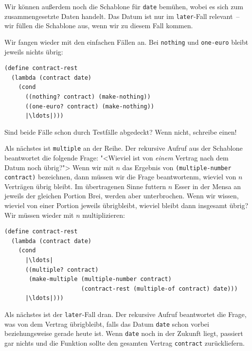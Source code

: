 %
Wir können außerdem noch die Schablone für \lstinline{date} bemühen,
wobei es sich zum zusammengesetzte Daten handelt.  Das Datum ist nur
im \lstinline{later}-Fall relevant~-- wir füllen die Schablone aus,
wenn wir zu diesem Fall kommen.

Wir fangen wieder mit den einfachen Fällen an.  Bei
\lstinline{nothing} und \lstinline{one-euro} bleibt jeweils nichts
übrig:
%
\begin{lstlisting}
(define contract-rest
  (lambda (contract date)
    (cond
      ((nothing? contract) (make-nothing))
      ((one-euro? contract) (make-nothing))
      |\ldots|)))
\end{lstlisting}
%
\begin{aufgabeinline}
  Sind beide Fälle schon durch Testfälle abgedeckt?  Wenn nicht,
  schreibe einen!
\end{aufgabeinline}
%
Als nächstes ist \lstinline{multiple} an der Reihe.  Der rekursive
Aufruf aus der Schablone beantwortet die folgende Frage: "<Wieviel ist
von \emph{einem} Vertrag nach dem Datum noch übrig?"> Wenn wir mit $n$
das Ergebnis von \lstinline{(multiple-number contract)} bezeichnen,
dann müssen wir die Frage beantwortenm, wieviel von $n$
Verträgen übrig bleibt.  Im übertragenen Sinne futtern $n$ Esser in
der Mensa an jeweils der gleichen Portion Brei, werden aber
unterbrochen. Wenn wir wissen, wieviel von einer Portion jeweils übrigbleibt,
wieviel bleibt dann insgesamt übrig?  Wir müssen wieder mit $n$
multiplizieren:
%
\begin{lstlisting}
(define contract-rest
  (lambda (contract date)
    (cond
      |\ldots|
      ((multiple? contract)
       (make-multiple (multiple-number contract)
                      (contract-rest (multiple-of contract) date)))
      |\ldots|)))
\end{lstlisting}
%
Als nächstes ist der \lstinline{later}-Fall dran.  Der rekursive
Aufruf beantwortet die Frage, was von dem Vertrag übrigbleibt, falls
das Datum \lstinline{date} schon vorbei beziehungsweise gerade heute
ist.  Wenn \lstinline{date} noch in der Zukunft liegt, passiert gar
nichts und die Funktion sollte den gesamten Vertrag
\lstinline{contract} zurückliefern.

